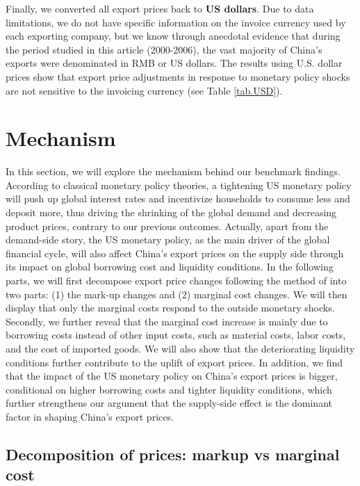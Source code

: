 Finally, we converted all export prices back to \textbf{US dollars}. Due to data limitations, we do not have specific information on the invoice currency used by each exporting company, but we know through anecdotal evidence that during the period studied in this article (2000-2006), the vast majority of China's exports were denominated in RMB or US dollars. The results using U.S. dollar prices show that export price adjustments in response to monetary policy shocks are not sensitive to the invoicing currency (see Table \ref{tab.USD}).

\newpage
\section{Mechanism}

In this section, we will explore the mechanism behind our benchmark findings. According to classical monetary policy theories, a tightening US monetary policy will push up global interest rates and incentivize households to consume less and deposit more, thus driving the shrinking of the global demand and decreasing product prices, contrary to our previous outcomes. Actually, apart from the demand-side story, the US monetary policy, as the main driver of the global financial cycle, will also affect China's export prices on the supply side through its impact on global borrowing cost and liquidity conditions. In the following parts, we will first decompose export price changes following the method of \cite{deloecker2012markups}into two parts: (1) the mark-up changes and (2) marginal cost changes. We will then display that only the marginal costs respond to the outside monetary shocks. Secondly, we further reveal that the marginal cost increase is mainly due to borrowing costs instead of other input costs, such as material costs, labor costs, and the cost of imported goods. We will also show that the deteriorating liquidity conditions further contribute to the uplift of export prices. In addition, we find that the impact of the US monetary policy on China's export prices is bigger, conditional on higher borrowing costs and tighter liquidity conditions, which further strengthens our argument that the supply-side effect is the dominant factor in shaping China's export prices.

\subsection{Decomposition of prices: markup vs marginal cost}

